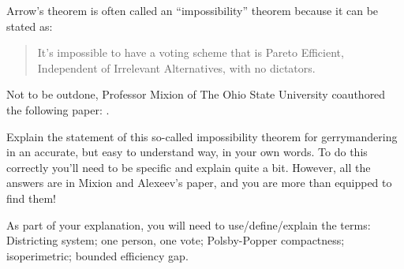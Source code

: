 \documentclass[nooutcomes,noauthor,hints,handout]{ximera}
\begin{document}
\begin{question}
  Arrow's theorem is often called an ``impossibility'' theorem because it
  can be stated as:
  \begin{quote}
    It's impossible to have a voting scheme that is Pareto Efficient,
    Independent of Irrelevant Alternatives, with no dictators.
  \end{quote}
  Not to be outdone, Professor Mixion of The Ohio State University
  coauthored the following paper: .


  Explain the statement of this so-called impossibility theorem for
  gerrymandering in an accurate, but easy to understand way, in your
  own words. To do this correctly you'll need to be specific and
  explain quite a bit. However, all the answers are in Mixion and
  Alexeev's paper, and you are more than equipped to find them!
  \begin{hint}
    As part of your explanation, you will need to use/define/explain
    the terms: Districting system; one person, one vote; Polsby-Popper
    compactness; isoperimetric; bounded efficiency gap.
  \end{hint}
\end{question}
\end{document}
